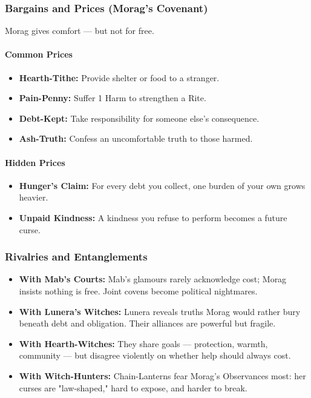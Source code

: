 \documentclass[11pt]{book}
\begin{document}
\subsubsection{Bargains and Prices (Morag's Covenant)}

Morag gives comfort --- but not for free.

\paragraph{Common Prices}
\begin{itemize}[leftmargin=*]
    \item \textbf{Hearth-Tithe:} Provide shelter or food to a stranger.
    \item \textbf{Pain-Penny:} Suffer 1 Harm to strengthen a Rite.
    \item \textbf{Debt-Kept:} Take responsibility for someone else's consequence.
    \item \textbf{Ash-Truth:} Confess an uncomfortable truth to those harmed.
\end{itemize}

\paragraph{Hidden Prices}
\begin{itemize}[leftmargin=*]
    \item \textbf{Hunger's Claim:} For every debt you collect, one burden of your own grows heavier.
    \item \textbf{Unpaid Kindness:} A kindness you refuse to perform becomes a future curse.
\end{itemize}

\subsubsection{Rivalries and Entanglements}

\begin{itemize}[leftmargin=*]
    \item \textbf{With Mab's Courts:} Mab's glamours rarely acknowledge cost; Morag insists nothing is free. Joint covens become political nightmares.
    \item \textbf{With Lunera's Witches:} Lunera reveals truths Morag would rather bury beneath debt and obligation. Their alliances are powerful but fragile.
    \item \textbf{With Hearth-Witches:} They share goals --- protection, warmth, community --- but disagree violently on whether help should always cost.
    \item \textbf{With Witch-Hunters:} Chain-Lanterns fear Morag's Observances most: her curses are "law-shaped," hard to expose, and harder to break.
\end{itemize}
\end{document}
